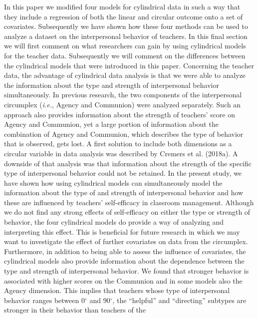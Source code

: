 \documentclass[man]{apa6}
\begin{document}
In this paper we modified four models for cylindrical data in such a way that
they include a regression of both the linear and circular outcome onto a set of
covariates. Subsequently we have shown how these four methods can be used to
analyze a dataset on the interpersonal behavior of teachers. In this final
section we will first comment on what researchers can gain by using cylindrical
models for the teacher data. Subsequently we will comment on the differences
between the cylindrical models that were introduced in this paper.\newline
\indent Concerning the teacher data, the advantage of cylindrical data analysis
is that we were able to analyze the information about the type and strength of
interpersonal behavior simultaneously. In previous research, the two components
of the interpersonal circumplex (\emph{i.e.}, Agency and Communion) were
analyzed separately. Such an approach also provides information about the
strength of teachers' score on Agency and Communion, yet a large portion of
information about the combination of Agency and Communion, which describes the
type of behavior that is observed, gets lost. A first solution to include both
dimensions as a circular variable in data analysis was described by
Cremers et al. (2018a). A downside of that analysis was that information about
the strength of the specific type of interpersonal behavior could not be
retained. In the present study, we have shown how using cylindrical models can
simultaneously model the information about the type of and strength of
interpersonal behavior and how these are influenced by teachers' self-efficacy
in classroom management. Although we do not find any strong effects of
self-efficacy on either the type or strength of behavior, the four cylindrical
models do provide a way of analyzing and interpreting this effect. This is
beneficial for future research in which we may want to investigate the effect of
further covariates on data from the circumplex. \newline
\indent Furthermore, in addition to being able to assess the influence of
covariates, the cylindrical models also provide information about the dependence
between the type and strength of interpersonal behavior. We found that stronger
behavior is associated with higher scores on the Communion and in some models
also the Agency dimension. This implies that teachers whose type of
interpersonal behavior ranges between 0\(^\circ\) and 90\(^\circ\), the \enquote{helpful}
and \enquote{directing} subtypes are stronger in their behavior than teachers of the
\end{document}
